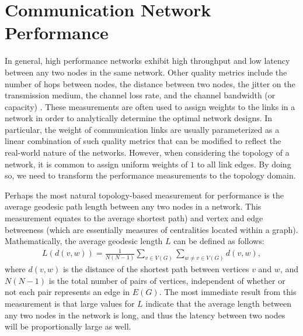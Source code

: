\documentclass[doc]{apa}%
\begin{document}
\section{Communication Network Performance}
\label{NetworkFunctionality}

In general, high performance networks exhibit high throughput and low latency between any two nodes in the same network. Other quality metrics include the number of hops between nodes, the distance between two nodes, the jitter on the transmission medium, the channel loss rate, and the channel bandwidth (or capacity) \cite{LargeNetworkRobustnessPVM}. These measurements are often used to assign weights to the links in a network in order to analytically determine the optimal network designs. In particular, the weight of communication links are usually parameterized as a linear combination of such quality metrics that can be modified to reflect the real-world nature of the networks. However, when considering the topology of a network, it is common to assign uniform weights of $1$ to all link edges. By doing so, we need to transform the performance measurements to the topology domain.

Perhaps the most natural topology-based measurement for performance is the average geodesic path length between any two nodes in a network. This measurement equates to the average shortest path) and vertex and edge betweeness (which are essentially measures of centralities located within a graph). Mathematically, the average geodesic length $L$ can be defined as follows:
\begin{eqnarray}
L(d(v,w)) = \frac{1}{N(N-1)}\sum_{v \in V(G)}\sum_{w \not= v \in V(G)} d(v,w),
\end{eqnarray}
where $d(v,w)$ is the distance of the shortest path between vertices $v$ and $w$, and $N(N-1)$ is the total number of pairs of vertices, independent of whether or not each pair represents an edge in $E(G)$. The most immediate result from this measurement is that large values for $L$ indicate that the average length between any two nodes in the network is long, and thus the latency between two nodes will be proportionally large as well. 
\end{document}
